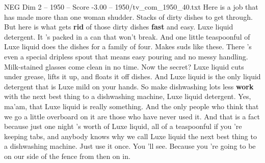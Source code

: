 \begin{textsample}{NEG Dim 2 – 1950 – Score -3.00 – 1950/tv\_com\_1950\_40.txt}  \label{ex:f2_neg_086}
Here is a job that has made more than one woman shudder.
Stacks of dirty dishes to get through.
But here is what gets \textbf{rid} of those dirty dishes \textbf{fast} and easy.
Luxe liquid detergent.
It 's packed in a can that won't break.
And one little teaspoonful of Luxe liquid does the dishes for a family of four.
Makes suds like these.
There 's even a special dripless spout that means easy pouring and no messy handling.
Milk-stained glasses come clean in no time.
Now the secret?
Luxe liquid cuts under grease, lifts it up, and floats it off dishes.
And Luxe liquid is the only liquid detergent that is Luxe mild on your hands.
So make dishwashing lots less \textbf{work} with the next best thing to a dishwashing machine, Luxe liquid detergent.
Yes, ma'am, that Luxe liquid is really something.
And the only people who think that we go a little overboard on it are those who have never used it.
And that is a fact because just one night 's worth of Luxe liquid, all of a teaspoonful if you 're keeping tabs, and anybody knows why we call Luxe liquid the next best thing to a dishwashing machine.
Just use it once.
You 'll see.
Because you 're going to be on our side of the fence from then on in.

\end{textsample}
